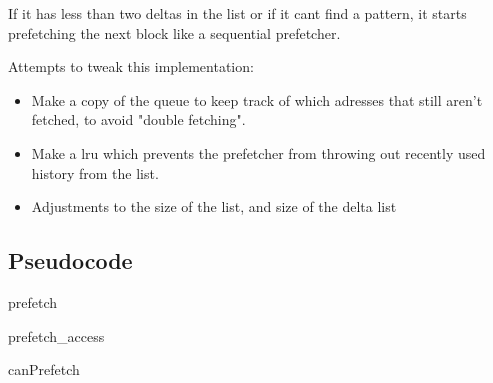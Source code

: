 \documentclass[12pt,journal,compsoc]{IEEEtran}
\begin{document}
If it has less than two deltas in the list or if it cant find a pattern, it starts prefetching the next block like a sequential prefetcher.

Attempts to tweak this implementation:
\begin{itemize}
\item Make a copy of the queue to keep track of which adresses that still aren't fetched, to avoid "double fetching".
\item Make a lru which prevents the prefetcher from throwing out recently used history from the list.
\item Adjustments to the size of the list, and size of the delta list
\end{itemize}

\subsection{Pseudocode}

\begin{algorithm}[H]
\dontprintsemicolon
{}

\caption{prefetch\label{pre}}
\end{algorithm}

\begin{algorithm}[H]
\dontprintsemicolon
{}

\caption{prefetch\_access\label{pa}}
\end{algorithm}

\begin{algorithm}[H]
\dontprintsemicolon
{}

\caption{canPrefetch\label{cp}}
\end{algorithm}
\end{document}
